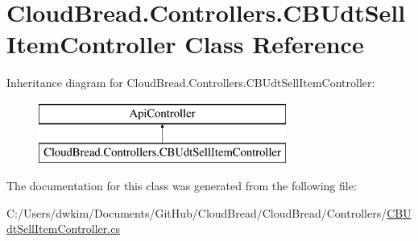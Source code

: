 \hypertarget{a00062}{}\section{Cloud\+Bread.\+Controllers.\+C\+B\+Udt\+Sell\+Item\+Controller Class Reference}
\label{a00062}
Inheritance diagram for Cloud\+Bread.\+Controllers.\+C\+B\+Udt\+Sell\+Item\+Controller\+:\begin{figure}[H]
\begin{center}
\leavevmode
\includegraphics[height=2.000000cm]{a00062}
\end{center}
\end{figure}


The documentation for this class was generated from the following file\+:\begin{DoxyCompactItemize}
\item 
C\+:/\+Users/dwkim/\+Documents/\+Git\+Hub/\+Cloud\+Bread/\+Cloud\+Bread/\+Controllers/\hyperlink{a00232}{C\+B\+Udt\+Sell\+Item\+Controller.\+cs}\end{DoxyCompactItemize}
